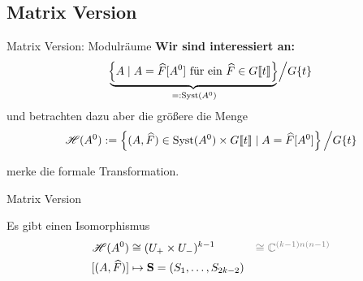 \subsection{Matrix Version}
\begin{frame}[t]{Matrix Version: Modulräume}
  \textbf{Wir sind interessiert an:}
  \[
    \underset{=:\operatorname{Syst}(A^0)}{\underbrace{\!
        \left\{A \mid A=\widehat F[A^0]\text{~für ein~}
          \widehat F\in G\llbracket t\rrbracket\right\}
    \!}\,}\Big/G\{t\}
  \]
  und betrachten dazu aber die größere die Menge
  \[
    \sH(A^0):=\left\{
      (A,~\tikzmark{e1}\!\!\hat F)\in\Syst(A^0)\times G\llbracket t\rrbracket
        \mid A=\hat F[A^0] \right\}\Big/G\{t\}
  \]
  \vspace{5mm}\begin{flushright}
     merke die formale Transformation.
  \end{flushright}

\end{frame}
\begin{frame}{Matrix Version}
  \begin{tthm}
    Es gibt einen Isomorphismus
    \begin{align*}
      \sH(A^0)&\cong(U_+\times U_-)^{k-1}
      &\textcolor{gray}{\cong\C^{(k-1)n(n-1)}}
    \\ [(A,\hat F)]&\mapsto\textbf{S}=(S_1,\dots,S_{2k-2})
    \end{align*}
  \end{tthm}
\end{frame}
